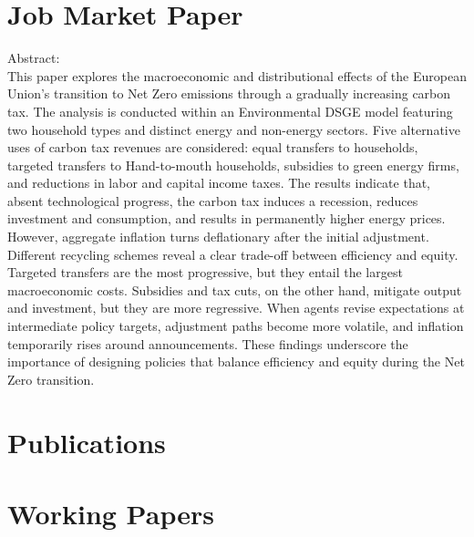 \documentclass[11pt,a4paper,sans]{moderncv}
\begin{document}
\section{Job Market Paper}
Abstract:\\
This paper explores the macroeconomic and distributional effects of the European Union's transition to Net Zero emissions through a gradually increasing carbon tax. The analysis is conducted within an Environmental DSGE model featuring two household types and distinct energy and non-energy sectors. Five alternative uses of carbon tax revenues are considered: equal transfers to households, targeted transfers to Hand-to-mouth households, subsidies to green energy firms, and reductions in labor and capital income taxes. The results indicate that, absent technological progress, the carbon tax induces a recession, reduces investment and consumption, and results in permanently higher energy prices. However, aggregate inflation turns deflationary after the initial adjustment. Different recycling schemes reveal a clear trade-off between efficiency and equity. Targeted transfers are the most progressive, but they entail the largest macroeconomic costs. Subsidies and tax cuts, on the other hand, mitigate output and investment, but they are more regressive. When agents revise expectations at intermediate policy targets, adjustment paths become more volatile, and inflation temporarily rises around announcements. These findings underscore the importance of designing policies that balance efficiency and equity during the Net Zero transition.

\section{Publications \Large{}}

\section{Working Papers}
\end{document}
